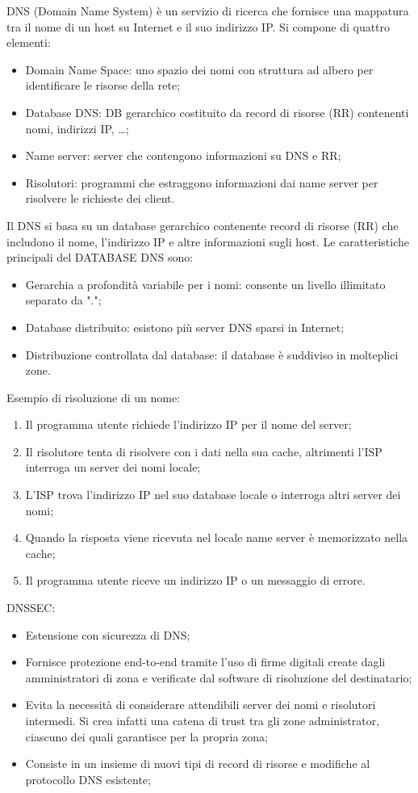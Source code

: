 DNS (Domain Name System) è un servizio di ricerca che fornisce una mappatura tra il nome di un host su Internet e il suo indirizzo IP. Si compone di quattro elementi:
\begin{itemize}
    \item Domain Name Space: uno spazio dei nomi con struttura ad albero per identificare le risorse della rete;
	\item Database DNS: DB gerarchico costituito da record di risorse (RR) contenenti nomi, indirizzi IP, …;
	\item Name server: server che contengono informazioni su DNS e RR;
	\item Risolutori: programmi che estraggono informazioni dai name server per risolvere le richieste dei client.
\end{itemize}

Il DNS si basa su un database gerarchico contenente record di risorse (RR) che includono il nome, l'indirizzo IP e altre informazioni sugli host. Le caratteristiche principali del DATABASE DNS sono:
\begin{itemize}
    \item Gerarchia a profondità variabile per i nomi: consente un livello illimitato separato da ".";
	\item Database distribuito: esistono più server DNS sparsi in Internet;
	\item Distribuzione controllata dal database: il database è suddiviso in molteplici zone.
\end{itemize}

Esempio di risoluzione di un nome:
\begin{enumerate}
    \item Il programma utente richiede l'indirizzo IP per il nome del server;
	\item Il risolutore tenta di risolvere con i dati nella sua cache, altrimenti l'ISP interroga un server dei nomi locale;
	\item L'ISP trova l'indirizzo IP nel suo database locale o interroga altri server dei nomi;
	\item Quando la risposta viene ricevuta nel locale name server è memorizzato nella cache;
	\item Il programma utente riceve un indirizzo IP o un messaggio di errore.
\end{enumerate}

DNSSEC: 
\begin{itemize}
    \item Estensione con sicurezza di DNS;
	\item Fornisce protezione end-to-end tramite l'uso di firme digitali create dagli amministratori di zona e verificate dal software di risoluzione del destinatario;
	\item Evita la necessità di considerare attendibili server dei nomi e risolutori intermedi. Si crea infatti una catena di trust tra gli zone administrator, ciascuno dei quali garantisce per la propria zona;
	\item Consiste in un insieme di nuovi tipi di record di risorse e modifiche al protocollo DNS esistente;
\end{itemize}
	
